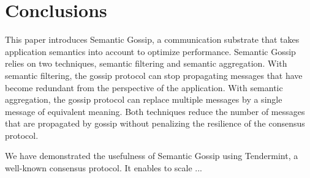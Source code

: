 \section{Conclusions}
\label{sec:conclusions}
\color{teal}
This paper introduces Semantic Gossip, a communication substrate that takes application semantics into account to optimize performance.
Semantic Gossip relies on two techniques, semantic filtering and semantic aggregation.
With semantic filtering, the gossip protocol can stop propagating messages that have become redundant from the perspective of the application.
With semantic aggregation, the gossip protocol can replace multiple messages by a single message of equivalent meaning.
Both techniques reduce the number of messages that are propagated by gossip without penalizing the resilience of the consensus protocol.
\color{black}

We have demonstrated the usefulness of Semantic Gossip using Tendermint, a well-known consensus protocol.  It enables to scale ...

